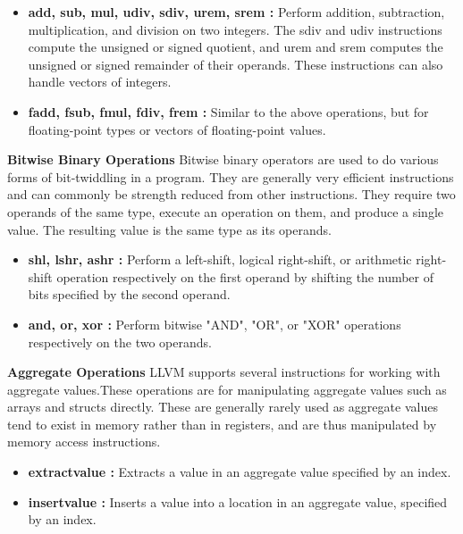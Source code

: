 \documentclass[openany]{book}
\begin{document}
	\begin{itemize}
		\item \textbf{add, sub,	mul, udiv, sdiv, urem, srem : }Perform addition, subtraction, multiplication, and division on two integers. The sdiv and udiv	instructions compute the  unsigned or signed quotient, and urem and srem computes  the  unsigned or	signed remainder of their operands. These instructions can also handle vectors of	integers.
		\item \textbf{fadd,	fsub, fmul, fdiv, frem : }Similar to the above operations, but for floating-point types or vectors of floating-point values.
	\end{itemize}

	\textbf{Bitwise Binary Operations} \newline \newline
	Bitwise binary operators are used to do various forms of bit-twiddling in a program. They are generally very efficient instructions and can commonly be strength reduced from other instructions. They require two operands of the same type, execute an operation on them, and produce a single value. The resulting value is the same type as its operands.
	
	\begin{itemize}
		\item \textbf{shl, lshr, ashr : } Perform a left-shift, logical right-shift, or arithmetic right-shift operation respectively on the first operand by shifting the number of bits specified by
		the second operand.
		\item \textbf{and, or, xor : } Perform bitwise "AND", "OR", or "XOR" operations respectively on the two operands.
	\end{itemize}

	\textbf{Aggregate Operations} \newline \newline
	LLVM supports several instructions for working with aggregate values.These operations are for manipulating aggregate values such as arrays and structs directly. These are generally rarely used as aggregate values tend to exist in memory rather	than in registers, and are thus manipulated by memory access instructions.
	
	\begin{itemize}
		\item \textbf{extractvalue : }Extracts a value in an aggregate value specified by an index.
		\item \textbf{insertvalue : } Inserts a value into a location in an aggregate value, specified by	an index.
	\end{itemize}
\end{document}
